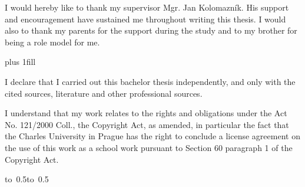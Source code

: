 \documentclass[12pt,a4paper]{report}
\let\openright=\clearpage
\begin{document}
\newpage



\openright

\noindent
I would hereby like to thank my supervisor Mgr. Jan Kolomazník. His support and
encouragement have sustained me throughout writing this thesis. I would also to thank
my parents for the support during the study and to my brother for being a role model
for me.

\newpage


\vglue 0pt plus 1fill

\noindent
I declare that I carried out this bachelor thesis independently, and only with the cited
sources, literature and other professional sources.

\medskip\noindent
I understand that my work relates to the rights and obligations under the Act No.
121/2000 Coll., the Copyright Act, as amended, in particular the fact that the Charles
University in Prague has the right to conclude a license agreement on the use of this
work as a school work pursuant to Section 60 paragraph 1 of the Copyright Act.

\vspace{10mm}

\hbox{\hbox to 0.5\hbox to 0.5}

\vspace{20mm}
\newpage

\end{document}
